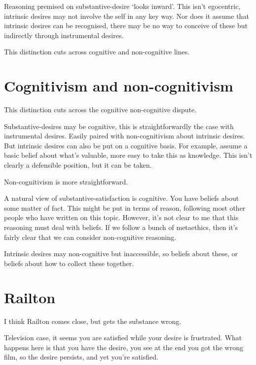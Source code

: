 \documentclass[10pt]{article}
\begin{document}
Reasoning premised on substantive-desire `looks inward'.
This isn't egocentric, intrinsic desires may not involve the self in any key way.
Nor does it assume that intrinsic desires can be recognised, there may be no way to conceive of these but indirectly through instrumental desires.




This distinction cuts across cognitive and non-cognitive lines.




\section{Cognitivism and non-cognitivism}
\label{sec:cogn-non-cogn}

This distinction cuts across the cognitive non-cognitive dispute.

Substantive-desires may be cognitive, this is straightforwardly the case with instrumental desires.
Easily paired with non-cognitivism about intrinsic desires.
But intrinsic desires can also be put on a cognitive basis.
For example, assume a basic belief about what's valuable, more easy to take this as knowledge.
This isn't clearly a defensible position, but it can be taken.

Non-cognitivism is more straightforward.

A natural view of substantive-satisfaction is cognitive.
You have beliefs about some matter of fact.
This might be put in terms of reason, following most other people who have written on this topic.
However, it's not clear to me that this reasoning must deal with beliefs.
If we follow a bunch of metaethics, then it's fairly clear that we can consider non-cognitive reasoning.



Intrinsic desires may non-cognitive but inaccessible, so beliefs about these, or beliefs about how to collect these together.




\section{Railton}
\label{sec:railton}

I think Railton comes close, but gets the substance wrong.


\newpage


Television case, it seems you are satisfied while your desire is frustrated.
What happens here is that you have the desire, you see at the end you got the wrong film, so the desire persists, and yet you're satisfied.
\end{document}
